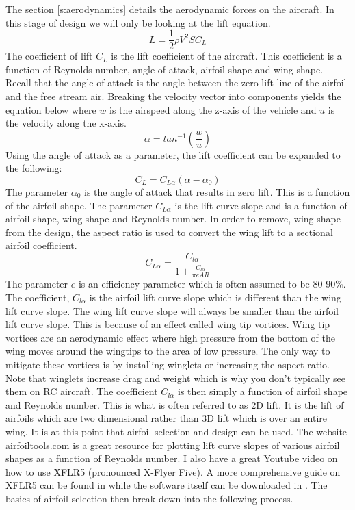 \documentclass{article}
\begin{document}
The section \ref{s:aerodynamics} details the aerodynamic forces on the
aircraft. In this stage of design we will only be looking at the lift
equation.
\begin{equation}
L = \frac{1}2\rho {V}^2 S C_L
\end{equation}
The coefficient of lift $C_L$ is the lift coefficient of the
aircraft. This coefficient is a function of Reynolds number, angle of
attack, airfoil shape and wing shape. Recall that the angle of attack
is the angle between the zero lift line of the airfoil and the free
stream air. Breaking the velocity vector into components yields the
equation below where $w$ is the airspeed along the z-axis of the
vehicle and $u$ is the velocity along the x-axis. 
\begin{equation}\label{e:aoa}
\alpha = tan^{-1}\left(\frac{w} {u} \right)
\end{equation}
Using the angle of attack as a parameter, the lift coefficient can be
expanded to the following:
\begin{equation}
C_L = C_{L\alpha}(\alpha-\alpha_0)
\end{equation}
The parameter $\alpha_0$ is the angle of attack that results in zero
lift. This is a function of the airfoil shape. The parameter
$C_{L\alpha}$ is the lift curve slope and is a function of airfoil
shape, wing shape and Reynolds number. In order to remove, wing shape
from the design, the aspect ratio is used to convert the wing lift to
a sectional airfoil coefficient.
\begin{equation}\label{e:ar_equation}
C_{L\alpha} = \frac{C_{l\alpha}}{1+\frac{C_{l\alpha}}{\pi e AR}}
\end{equation}
The parameter $e$ is an efficiency parameter which is often assumed to
be 80-90\%. The coefficient, $C_{l\alpha}$ is the airfoil lift curve
slope which is different than the wing lift curve slope. The wing lift curve slope
will always be smaller than the airfoil lift curve slope. This is
because of an effect called wing tip vortices. Wing tip vortices are
an aerodynamic effect where high pressure from the bottom of the wing
moves around the wingtips to the area of low pressure. The only way to
mitigate these vortices is by installing winglets or increasing the
aspect ratio. Note that winglets increase drag and weight which is why
you don't typically see them on RC aircraft. The coefficient
$C_{l\alpha}$ is then simply a function of airfoil shape and
Reynolds number. This is what is often referred to as 2D lift. It is
the lift of airfoils which are two dimensional rather than 3D lift
which is over an entire wing. It is at this point that airfoil
selection and design can be used. The website \url{airfoiltools.com}
is a great resource for plotting lift curve slopes of various airfoil
shapes as a function of Reynolds number. I also have a great Youtube
video on how to use XFLR5 (pronounced X-Flyer
Five)\cite{XFLR5_tutorial}. A more comprehensive guide on XFLR5 can be
found in \cite{XFLR5_Guidelines} while the software itself can be
downloaded in \cite{XFLR5}. The basics of airfoil selection then break
down into the following 
process.
\end{document}
